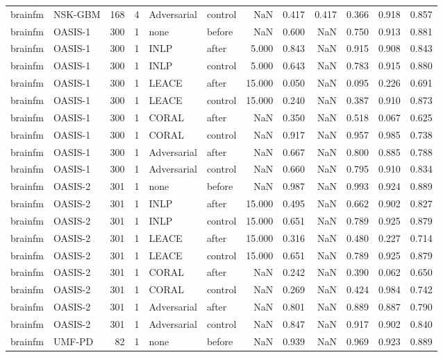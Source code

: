 \begin{tabular}{llrrllrrrrrr}
brainfm & NSK-GBM & 168 & 4 & Adversarial & control & NaN & 0.417 & 0.417 & 0.366 & 0.918 & 0.857 \\
brainfm & OASIS-1 & 300 & 1 & none & before & NaN & 0.600 & NaN & 0.750 & 0.913 & 0.881 \\
brainfm & OASIS-1 & 300 & 1 & INLP & after & 5.000 & 0.843 & NaN & 0.915 & 0.908 & 0.843 \\
brainfm & OASIS-1 & 300 & 1 & INLP & control & 5.000 & 0.643 & NaN & 0.783 & 0.915 & 0.880 \\
brainfm & OASIS-1 & 300 & 1 & LEACE & after & 15.000 & 0.050 & NaN & 0.095 & 0.226 & 0.691 \\
brainfm & OASIS-1 & 300 & 1 & LEACE & control & 15.000 & 0.240 & NaN & 0.387 & 0.910 & 0.873 \\
brainfm & OASIS-1 & 300 & 1 & CORAL & after & NaN & 0.350 & NaN & 0.518 & 0.067 & 0.625 \\
brainfm & OASIS-1 & 300 & 1 & CORAL & control & NaN & 0.917 & NaN & 0.957 & 0.985 & 0.738 \\
brainfm & OASIS-1 & 300 & 1 & Adversarial & after & NaN & 0.667 & NaN & 0.800 & 0.885 & 0.788 \\
brainfm & OASIS-1 & 300 & 1 & Adversarial & control & NaN & 0.660 & NaN & 0.795 & 0.910 & 0.834 \\
brainfm & OASIS-2 & 301 & 1 & none & before & NaN & 0.987 & NaN & 0.993 & 0.924 & 0.889 \\
brainfm & OASIS-2 & 301 & 1 & INLP & after & 15.000 & 0.495 & NaN & 0.662 & 0.902 & 0.827 \\
brainfm & OASIS-2 & 301 & 1 & INLP & control & 15.000 & 0.651 & NaN & 0.789 & 0.925 & 0.879 \\
brainfm & OASIS-2 & 301 & 1 & LEACE & after & 15.000 & 0.316 & NaN & 0.480 & 0.227 & 0.714 \\
brainfm & OASIS-2 & 301 & 1 & LEACE & control & 15.000 & 0.651 & NaN & 0.789 & 0.925 & 0.879 \\
brainfm & OASIS-2 & 301 & 1 & CORAL & after & NaN & 0.242 & NaN & 0.390 & 0.062 & 0.650 \\
brainfm & OASIS-2 & 301 & 1 & CORAL & control & NaN & 0.269 & NaN & 0.424 & 0.984 & 0.742 \\
brainfm & OASIS-2 & 301 & 1 & Adversarial & after & NaN & 0.801 & NaN & 0.889 & 0.887 & 0.790 \\
brainfm & OASIS-2 & 301 & 1 & Adversarial & control & NaN & 0.847 & NaN & 0.917 & 0.902 & 0.840 \\
brainfm & UMF-PD & 82 & 1 & none & before & NaN & 0.939 & NaN & 0.969 & 0.923 & 0.889 \\

\end{tabular}
